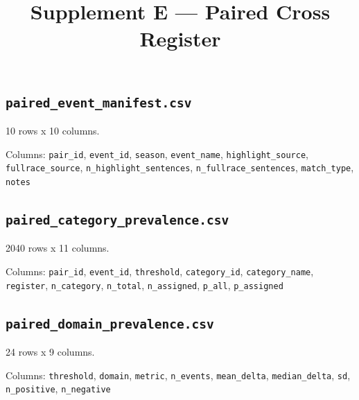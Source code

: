 \documentclass[10pt,a4paper]{article}
\title{\vspace{-14mm}\large Supplement E --- Paired Cross Register}
\author{}\date{}
\begin{document}
\maketitle\thispagestyle{fancy}
\subsection*{\texttt{paired\_\allowbreak{}event\_\allowbreak{}manifest.csv}}
10 rows x 10 columns.

{\raggedright Columns: \texttt{pair\_\allowbreak{}id}, \texttt{event\_\allowbreak{}id}, \texttt{season}, \texttt{event\_\allowbreak{}name}, \texttt{highlight\_\allowbreak{}source}, \texttt{fullrace\_\allowbreak{}source}, \texttt{n\_\allowbreak{}highlight\_\allowbreak{}sentences}, \texttt{n\_\allowbreak{}fullrace\_\allowbreak{}sentences}, \texttt{match\_\allowbreak{}type}, \texttt{notes}\par}

\subsection*{\texttt{paired\_\allowbreak{}category\_\allowbreak{}prevalence.csv}}
2040 rows x 11 columns.

{\raggedright Columns: \texttt{pair\_\allowbreak{}id}, \texttt{event\_\allowbreak{}id}, \texttt{threshold}, \texttt{category\_\allowbreak{}id}, \texttt{category\_\allowbreak{}name}, \texttt{register}, \texttt{n\_\allowbreak{}category}, \texttt{n\_\allowbreak{}total}, \texttt{n\_\allowbreak{}assigned}, \texttt{p\_\allowbreak{}all}, \texttt{p\_\allowbreak{}assigned}\par}

\subsection*{\texttt{paired\_\allowbreak{}domain\_\allowbreak{}prevalence.csv}}
24 rows x 9 columns.

{\raggedright Columns: \texttt{threshold}, \texttt{domain}, \texttt{metric}, \texttt{n\_\allowbreak{}events}, \texttt{mean\_\allowbreak{}delta}, \texttt{median\_\allowbreak{}delta}, \texttt{sd}, \texttt{n\_\allowbreak{}positive}, \texttt{n\_\allowbreak{}negative}\par}
\end{document}
